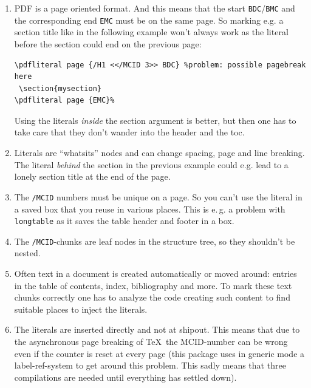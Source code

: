 \documentclass[DIV=12,parskip=half-,bibliography=totoc]{scrartcl}
\newcommand\PDF{PDF}
\begin{document}
\begin{enumerate}[beginpenalty=10000]
  \item \PDF{} is a page oriented format. And this means that the start \texttt{BDC}/\texttt{BMC}  and the corresponding end \texttt{EMC} must be on the same page.
  So marking e.g. a section title like in the following example won't always work  as the literal before the section could end on the previous page:


\begin{lstlisting}
\pdfliteral page {/H1 <</MCID 3>> BDC} %problem: possible pagebreak here
 \section{mysection}
\pdfliteral page {EMC}%
\end{lstlisting}


  Using the literals \emph{inside} the section argument is better, but then one has to take care that they don't wander into the header and the toc.

  \item
  Literals are \enquote{whatsits} nodes and can change spacing, page and line breaking. The literal \emph{behind} the section in the previous example could e.g. lead to a lonely section title at the end of the page.

  \item
   The \texttt{/MCID} numbers must be unique on a page. So you can't use the literal in a saved box that you reuse in various places. This is e.\,g. a problem with \texttt{longtable} as it saves the table header and footer in a box.

  \item
  The  \texttt{/MCID}-chunks are leaf nodes in the structure tree, so they shouldn't be nested.

  \item
  Often text in a document is created automatically or moved around: entries in the table of contents, index, bibliography and more. To mark these text chunks correctly one has to analyze the code creating such content to find suitable places to inject the literals.

  \item
  The literals are inserted directly and not at shipout. This means that due to the asynchronous page breaking of \TeX\ the MCID-number can be wrong even if the counter is reset at every page (this package uses in generic mode a label-ref-system to get around this problem. This sadly means that three compilations are needed until everything has settled down).


\end{enumerate}
\end{document}
